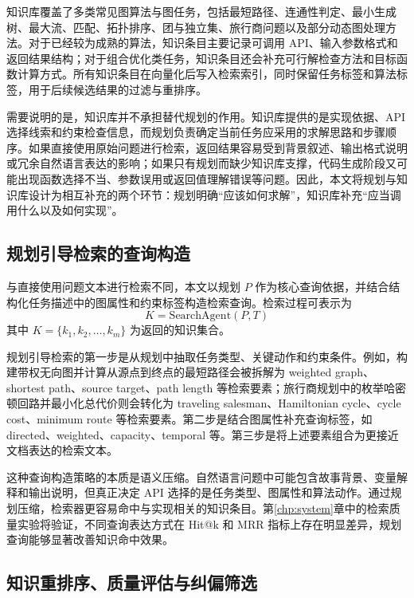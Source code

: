 知识库覆盖了多类常见图算法与图任务，包括最短路径、连通性判定、最小生成树、最大流、匹配、拓扑排序、团与独立集、旅行商问题以及部分动态图处理方法。对于已经较为成熟的算法，知识条目主要记录可调用 API、输入参数格式和返回结果结构；对于组合优化类任务，知识条目还会补充可行解检查方法和目标函数计算方式。所有知识条目在向量化后写入检索索引，同时保留任务标签和算法标签，用于后续候选结果的过滤与重排序。

需要说明的是，知识库并不承担替代规划的作用。知识库提供的是实现依据、API 选择线索和约束检查信息，而规划负责确定当前任务应采用的求解思路和步骤顺序。如果直接使用原始问题进行检索，返回结果容易受到背景叙述、输出格式说明或冗余自然语言表达的影响；如果只有规划而缺少知识库支撑，代码生成阶段又可能出现函数选择不当、参数误用或返回值理解错误等问题。因此，本文将规划与知识库设计为相互补充的两个环节：规划明确“应该如何求解”，知识库补充“应当调用什么以及如何实现”。

\subsection{规划引导检索的查询构造}

与直接使用问题文本进行检索不同，本文以规划 $P$ 作为核心查询依据，并结合结构化任务描述中的图属性和约束标签构造检索查询。检索过程可表示为
\begin{equation}
K=\mathrm{SearchAgent}(P,T)
\end{equation}
其中 $K=\{k_1,k_2,\ldots,k_m\}$ 为返回的知识集合。

规划引导检索的第一步是从规划中抽取任务类型、关键动作和约束条件。例如，构建带权无向图并计算从源点到终点的最短路径会被拆解为 weighted graph、shortest path、source target、path length 等检索要素；旅行商规划中的枚举哈密顿回路并最小化总代价则会转化为 traveling salesman、Hamiltonian cycle、cycle cost、minimum route 等检索要素。第二步是结合图属性补充查询标签，如 directed、weighted、capacity、temporal 等。第三步是将上述要素组合为更接近文档表达的检索文本。

这种查询构造策略的本质是语义压缩。自然语言问题中可能包含故事背景、变量解释和输出说明，但真正决定 API 选择的是任务类型、图属性和算法动作。通过规划压缩，检索器更容易命中与实现相关的知识条目。第\ref{chp:system}章中的检索质量实验将验证，不同查询表达方式在 Hit@k 和 MRR 指标上存在明显差异，规划查询能够显著改善知识命中效果。

\subsection{知识重排序、质量评估与纠偏筛选}

